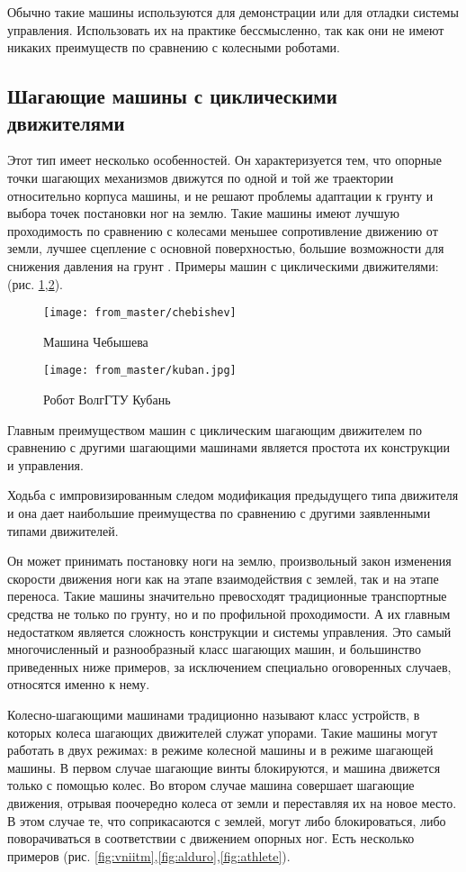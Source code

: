 Обычно такие машины используются для демонстрации или для отладки системы управления. Использовать их на практике бессмысленно, так как они не имеют никаких преимуществ по сравнению с колесными роботами.


\subsection{Шагающие машины с циклическими движителями}
Этот тип имеет несколько особенностей. Он характеризуется тем, что опорные точки шагающих механизмов движутся по одной и той же траектории относительно корпуса машины, и не решают проблемы адаптации к грунту и выбора точек постановки ног на землю. Такие машины имеют лучшую проходимость по сравнению с колесами меньшее сопротивление движению от земли, лучшее сцепление с основной поверхностью, большие возможности для снижения давления на грунт \cite{cruse2001control}. Примеры машин с циклическими движителями: (рис. \ref{fig:chebishev},\ref{fig:kuban}).

\begin{figure}[H]
\centering\texttt{[image: from\_master/chebishev]}
\caption{Машина Чебышева}
\label{fig:chebishev}
\end{figure}

\begin{figure}[H]
\centering\texttt{[image: from\_master/kuban.jpg]}
\caption{Робот ВолгГТУ Кубань}
\label{fig:kuban}
\end{figure}

Главным преимуществом машин с циклическим шагающим движителем по сравнению с другими шагающими машинами является простота их конструкции и управления.

Ходьба с импровизированным следом модификация предыдущего типа движителя и она дает наибольшие преимущества по сравнению с другими заявленными типами движителей. 

Он может принимать постановку ноги на землю, произвольный закон изменения скорости движения ноги как на этапе взаимодействия с землей, так и на этапе переноса. Такие машины значительно превосходят традиционные транспортные средства не только по грунту, но и по профильной проходимости. А их главным недостатком является сложность конструкции и системы управления. Это самый многочисленный и разнообразный класс шагающих машин, и большинство приведенных ниже примеров, за исключением специально оговоренных случаев, относятся именно к нему.

Колесно-шагающими машинами традиционно называют класс устройств, в которых колеса шагающих движителей служат упорами. Такие машины могут работать в двух режимах: в режиме колесной машины и в режиме шагающей машины. В первом случае шагающие винты блокируются, и машина движется только с помощью колес. Во втором случае машина совершает шагающие движения, отрывая поочередно колеса от земли и переставляя их на новое место. В этом случае те, что соприкасаются с землей, могут либо блокироваться, либо поворачиваться в соответствии с движением опорных ног.
Есть несколько примеров (рис. \ref{fig:vniitm},\ref{fig:alduro},\ref{fig:athlete})\cite{germann2001joystick}.

